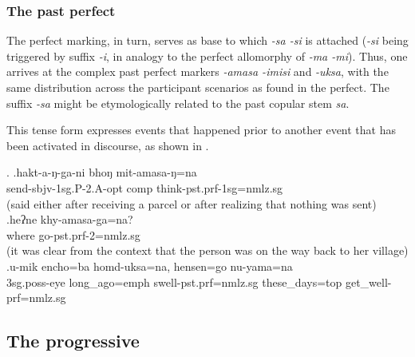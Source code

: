 	
\subsubsection{The past perfect}\label{pstprf}
	
The perfect marking, in turn, serves as base to which \emph{-sa \ti -si} is attached (\emph{-si} being triggered by suffix \emph{-i}, in analogy to the perfect allomorphy of \emph{-ma \ti -mi}). Thus, one arrives at the complex past perfect markers \emph{-amasa \ti -imisi} and  \emph{-uksa}, with the same distribution across the participant scenarios as found in the perfect. The suffix \emph{-sa} might be etymologically related to the past copular stem \emph{sa}. 

This tense form expresses events that happened prior to another event that has been activated in discourse, as shown in \Next.

\ex. \ag.hakt-a-ŋ-ga-ni bhoŋ mit-amasa-ŋ=na\\
send{\sc -sbjv-1sg.P-2.A-opt} {\sc comp} think{\sc -pst.prf-1sg=nmlz.sg}\\
 (said either after receiving a parcel or after realizing that nothing was sent)
\bg.heʔne khy-amasa-ga=na?\\
where go{\sc -pst.prf-2=nmlz.sg}\\
 (it was clear from the context that the person was on the way back to her village) 
	\bg.u-mik encho=ba homd-uksa=na, hensen=go nu-yama=na\\
		{\sc 3sg.poss-}eye long\_ago{\sc =emph} swell{\sc -pst.prf=nmlz.sg} these\_days{\sc =top} get\_well{\sc -prf=nmlz.sg}\\
		
		
\subsection{The  progressive}\label{progressive}

